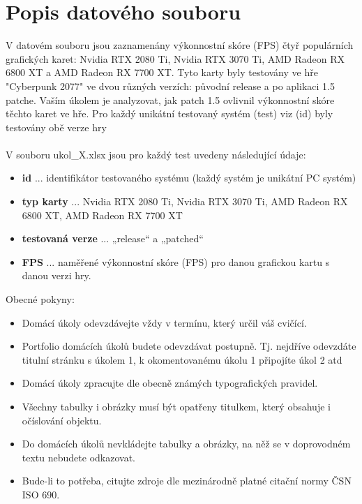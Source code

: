 \section*{Popis datového souboru}
\label{sec:data-source-description}

V datovém souboru jsou zaznamenány výkonnostní skóre (FPS) čtyř populárních grafických karet:
Nvidia RTX 2080 Ti, Nvidia RTX 3070 Ti, AMD Radeon RX 6800 XT a AMD Radeon RX 7700 XT. Tyto karty
byly testovány ve hře "Cyberpunk 2077" ve dvou různých verzích: původní release a po aplikaci 1.5
patche. Vaším úkolem je analyzovat, jak patch 1.5 ovlivnil výkonnostní skóre těchto karet ve hře. Pro
každý unikátní testovaný systém (test) viz (id) byly testovány obě verze hry\\\\
V souboru ukol\_X.xlsx jsou pro každý test uvedeny následující údaje:

\begin{itemize}
  \item \textbf{id} ... identifikátor testovaného systému (každý systém je unikátní PC systém)
  \item \textbf{typ karty} ... Nvidia RTX 2080 Ti, Nvidia RTX 3070 Ti, AMD Radeon RX 6800 XT, AMD Radeon RX
7700 XT
  \item  \textbf{testovaná verze} ... „release“ a „patched“
  \item \textbf{FPS} ... naměřené výkonnostní skóre (FPS) pro danou grafickou kartu s danou verzi hry.
\end{itemize}

\noindent Obecné pokyny:

\begin{itemize}
    \item Domácí úkoly odevzdávejte vždy v termínu, který určil váš cvičící.
    \item Portfolio domácích úkolů budete odevzdávat postupně. Tj. nejdříve odevzdáte titulní stránku
s úkolem 1, k okomentovanému úkolu 1 připojíte úkol 2 atd
    \item Domácí úkoly zpracujte dle obecně známých typografických pravidel. 
    \item Všechny tabulky i obrázky musí být opatřeny titulkem, který obsahuje i očíslování objektu.  
    \item Do domácích úkolů nevkládejte tabulky a obrázky, na něž se v doprovodném textu nebudete odkazovat.
    \item Bude-li to potřeba, citujte zdroje dle mezinárodně platné citační normy ČSN ISO 690.
\end{itemize}

\endinput